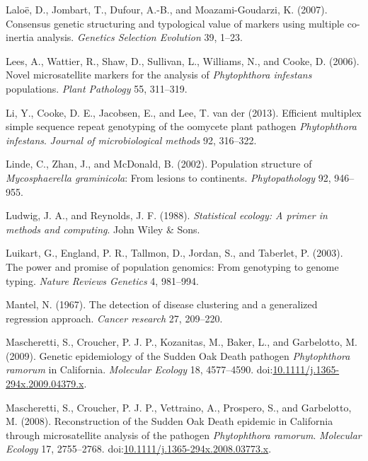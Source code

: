 \documentclass[double,12pt]{beavtex}
\begin{document}
  \hypertarget{ref-laloe2007consensus}{}
  Laloë, D., Jombart, T., Dufour, A.-B., and Moazami-Goudarzi, K. (2007).
  Consensus genetic structuring and typological value of markers using
  multiple co-inertia analysis. \emph{Genetics Selection Evolution} 39,
  1--23.
  
  \hypertarget{ref-lees2006novel}{}
  Lees, A., Wattier, R., Shaw, D., Sullivan, L., Williams, N., and Cooke,
  D. (2006). Novel microsatellite markers for the analysis of
  \emph{Phytophthora infestans} populations. \emph{Plant Pathology} 55,
  311--319.
  
  \hypertarget{ref-li2013efficient}{}
  Li, Y., Cooke, D. E., Jacobsen, E., and Lee, T. van der (2013).
  Efficient multiplex simple sequence repeat genotyping of the oomycete
  plant pathogen \emph{Phytophthora infestans}. \emph{Journal of
  microbiological methods} 92, 316--322.
  
  \hypertarget{ref-linde2002population}{}
  Linde, C., Zhan, J., and McDonald, B. (2002). Population structure of
  \emph{Mycosphaerella graminicola}: From lesions to continents.
  \emph{Phytopathology} 92, 946--955.
  
  \hypertarget{ref-ludwig1988statistical}{}
  Ludwig, J. A., and Reynolds, J. F. (1988). \emph{Statistical ecology: A
  primer in methods and computing}. John Wiley \& Sons.
  
  \hypertarget{ref-luikart2003power}{}
  Luikart, G., England, P. R., Tallmon, D., Jordan, S., and Taberlet, P.
  (2003). The power and promise of population genomics: From genotyping to
  genome typing. \emph{Nature Reviews Genetics} 4, 981--994.
  
  \hypertarget{ref-mantel1967detection}{}
  Mantel, N. (1967). The detection of disease clustering and a generalized
  regression approach. \emph{Cancer research} 27, 209--220.
  
  \hypertarget{ref-mascheretti2009genetic}{}
  Mascheretti, S., Croucher, P. J. P., Kozanitas, M., Baker, L., and
  Garbelotto, M. (2009). Genetic epidemiology of the Sudden Oak Death
  pathogen \emph{Phytophthora ramorum} in California. \emph{Molecular
  Ecology} 18, 4577--4590.
  doi:\href{https://doi.org/10.1111/j.1365-294x.2009.04379.x}{10.1111/j.1365-294x.2009.04379.x}.
  
  \hypertarget{ref-mascheretti2008reconstruction}{}
  Mascheretti, S., Croucher, P. J. P., Vettraino, A., Prospero, S., and
  Garbelotto, M. (2008). Reconstruction of the Sudden Oak Death epidemic
  in California through microsatellite analysis of the pathogen
  \emph{Phytophthora ramorum}. \emph{Molecular Ecology} 17, 2755--2768.
  doi:\href{https://doi.org/10.1111/j.1365-294x.2008.03773.x}{10.1111/j.1365-294x.2008.03773.x}.
  
\end{document}

